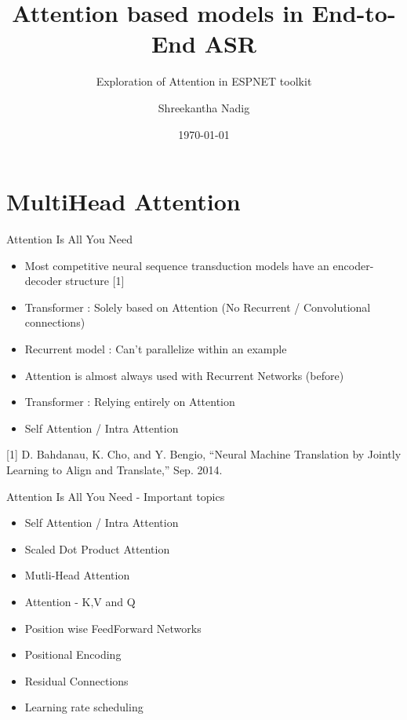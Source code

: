 \documentclass{beamer}
\title{Attention based models in End-to-End ASR}
\subtitle{Exploration of Attention in ESPNET toolkit}
\date{\today}
\author{Shreekantha Nadig}
\institute{International Institute of Information Technology - Bangalore}
\begin{document}

\section{MultiHead Attention}
\begin{frame}[fragile]{Attention Is All You Need}
	\begin{itemize}
		\item Most competitive neural sequence transduction models have an encoder-decoder structure [1]
		\item Transformer : Solely based on Attention (No Recurrent / Convolutional connections)
		\item Recurrent model : Can't parallelize within an example
		\item Attention is almost always used with Recurrent Networks (before)
		\item Transformer : Relying entirely on Attention
		\item Self Attention / Intra Attention
	\end{itemize}
[1] D. Bahdanau, K. Cho, and Y. Bengio, “Neural Machine Translation by Jointly Learning to Align and Translate,” Sep. 2014.
\end{frame}

\begin{frame}[fragile]{Attention Is All You Need - Important topics}
\begin{itemize}
	\item Self Attention / Intra Attention
	\item Scaled Dot Product Attention
	\item Mutli-Head Attention
	\item Attention - K,V and Q
	\item Position wise FeedForward Networks
	\item Positional Encoding
	\item Residual Connections
	\item Learning rate scheduling
\end{itemize}
\end{frame}
\end{document}
